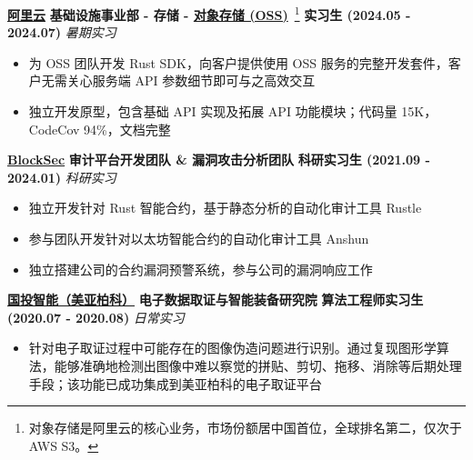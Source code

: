     \noindent \textbf{\href{https://www.aliyun.com}{阿里云}} \textbar{} \textbf{基础设施事业部 - 存储 - \href{https://www.aliyun.com/product/oss}{对象存储 (OSS)}}~\footnote{对象存储是阿里云的核心业务，市场份额居中国首位，全球排名第二，仅次于 AWS S3。} \textbar{} \textbf{实习生 (2024.05 - 2024.07)} \hfill \textsl{暑期实习}

    \begin{itemize}
        \item 为 OSS 团队开发 Rust SDK，向客户提供使用 OSS 服务的完整开发套件，客户无需关心服务端 API 参数细节即可与之高效交互
        \item 独立开发原型，包含基础 API 实现及拓展 API 功能模块；代码量 15K，CodeCov 94\%，文档完整
    \end{itemize}

    \noindent \textbf{\href{https://blocksec.com}{BlockSec}} \textbar{} \textbf{审计平台开发团队 \& 漏洞攻击分析团队} \textbar{} \textbf{科研实习生 (2021.09 - 2024.01)} \hfill \textsl{科研实习}

    \begin{itemize}
        \item 独立开发针对 Rust 智能合约，基于静态分析的自动化审计工具 Rustle
        \item 参与团队开发针对以太坊智能合约的自动化审计工具 Anshun
        \item 独立搭建公司的合约漏洞预警系统，参与公司的漏洞响应工作
    \end{itemize}

    \noindent \textbf{\href{https://300188.cn}{国投智能（美亚柏科）}} \textbar{} \textbf{电子数据取证与智能装备研究院} \textbar{} \textbf{算法工程师实习生 (2020.07 - 2020.08)} \hfill \textsl{日常实习}


    \begin{itemize}
        \item 针对电子取证过程中可能存在的图像伪造问题进行识别。通过复现图形学算法，能够准确地检测出图像中难以察觉的拼贴、剪切、拖移、消除等后期处理手段；该功能已成功集成到美亚柏科的电子取证平台
    \end{itemize}

\fi

\hfill
